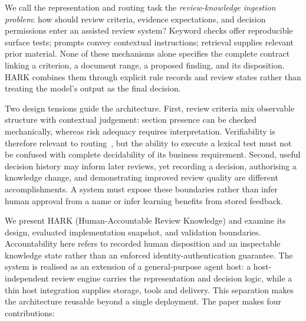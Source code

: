 \documentclass[computers,article,submit,moreauthors]{Definitions/mdpi}
\begin{document}
We call the representation and routing task the \emph{review-knowledge ingestion problem}: how should review criteria, evidence expectations, and decision permissions enter an assisted review system? Keyword checks offer reproducible surface tests; prompts convey contextual instructions; retrieval supplies relevant prior material. None of these mechanisms alone specifies the complete contract linking a criterion, a document range, a proposed finding, and its disposition. HARK combines them through explicit rule records and review states rather than treating the model's output as the final decision.

Two design tensions guide the architecture. First, review criteria mix observable structure with contextual judgement: section presence can be checked mechanically, whereas risk adequacy requires interpretation. Verifiability is therefore relevant to routing~\cite{iso29148,genova2013}, but the ability to execute a lexical test must not be confused with complete decidability of its business requirement. Second, useful decision history may inform later reviews, yet recording a decision, authorising a knowledge change, and demonstrating improved review quality are different accomplishments. A system must expose these boundaries rather than infer human approval from a name or infer learning benefits from stored feedback.

We present HARK (Human-Accountable Review Knowledge) and examine its design, evaluated implementation snapshot, and validation boundaries. Accountability here refers to recorded human disposition and an inspectable knowledge state rather than an enforced identity-authentication guarantee. The system is realised as an extension of a general-purpose agent host: a host-independent review engine carries the representation and decision logic, while a thin host integration supplies storage, tools and delivery. This separation makes the architecture reusable beyond a single deployment. The paper makes four contributions:
\end{document}
